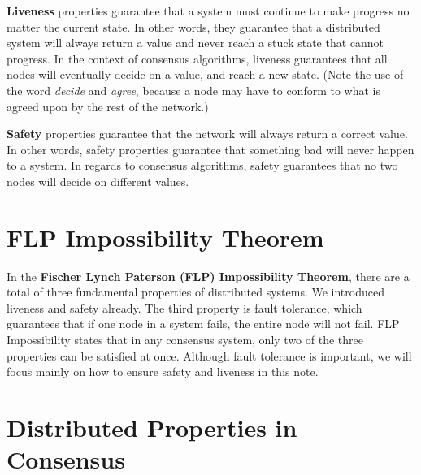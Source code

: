 \documentclass[full.tex]{subfiles}
\begin{document}
    \textbf{Liveness} properties guarantee that a system must continue to make progress no matter the current state. In other words, they guarantee that a distributed system will always return a value and never reach a stuck state that cannot progress. In the context of consensus algorithms, liveness guarantees that all nodes will eventually decide on a value, and reach a new state. (Note the use of the word \textit{decide} and \textit{agree}, because a node may have to conform to what is agreed upon by the rest of the network.)
    
    \textbf{Safety} properties guarantee that the network will always return a correct value. In other words, safety properties guarantee that something bad will never happen to a system. In regards to consensus algorithms, safety guarantees that no two nodes will decide on different values. 
    

    \section*{FLP Impossibility Theorem}
    
    In the \textbf{Fischer Lynch Paterson (FLP) Impossibility Theorem}, there are a total of three fundamental properties of distributed systems. We introduced liveness and safety already. The third property is fault tolerance, which guarantees that if one node in a system fails, the entire node will not fail. FLP Impossibility states that in any consensus system, only two of the three properties can be satisfied at once. Although fault tolerance is important, we will focus mainly on how to ensure safety and liveness in this note.
    
    \section*{Distributed Properties in Consensus}
    
    
\end{document}
